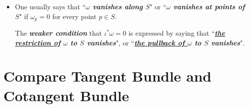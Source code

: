 \documentclass[11pt]{article}
\begin{document}
\begin{itemize}
\item \begin{remark}
One usually says that ``\emph{\textbf{$\omega$ vanishes along $S$}}" or ``\emph{\textbf{$\omega$ vanishes at points of $S$}}"
if $\omega_p = 0$ for every point $p \in S$. 

The \emph{\textbf{weaker condition}} that $\iota^{*}\omega = 0$ is expressed by saying that ``\emph{\textbf{\underline{the restriction of} $\omega$ to $S$ vanishes}}", or ``\emph{\textbf{\underline{the pullback of $\omega$} to $S$ vanishes}}".
\end{remark}

\end{itemize}

\newpage

\section{Compare Tangent Bundle and Cotangent Bundle}
\end{document}
